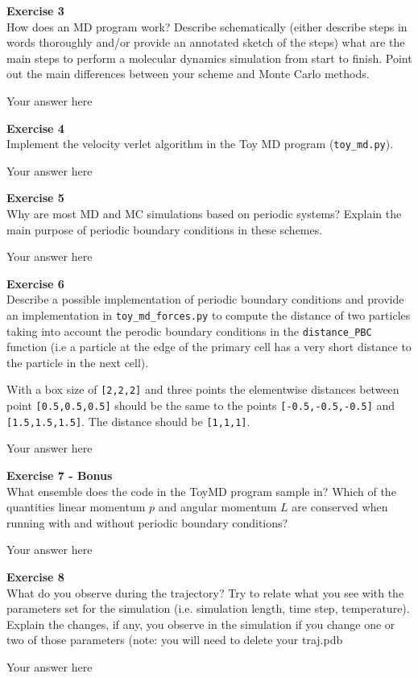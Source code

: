 \documentclass{article}
\begin{document}
\begin{mdframed}
\textbf{Exercise 3}\\
How does an MD program work? Describe schematically (either describe steps in words thoroughly and/or provide an annotated sketch of the steps) what are the main steps to perform a molecular dynamics simulation from start to finish. Point out the main
differences between your scheme and Monte Carlo methods.
\end{mdframed}

Your answer here

\begin{mdframed}
\textbf{Exercise 4}\\
Implement the velocity verlet algorithm in the Toy MD program (\texttt{toy\_md.py}).
\end{mdframed}

Your answer here

\begin{mdframed}
\textbf{Exercise 5}\\
Why are most MD and MC simulations based on periodic systems? Explain the main purpose of periodic boundary conditions in these schemes.
\end{mdframed}

Your answer here

\begin{mdframed}
\textbf{Exercise 6}\\
Describe a possible implementation of periodic boundary conditions and provide an implementation in \texttt{toy\_md\_forces.py} to compute the distance of two particles taking into account the perodic boundary conditions in the \texttt{distance\_PBC} function (i.e a particle at the edge of the primary cell has a very short distance to the particle in the next cell).

With a box size of \texttt{[2,2,2]} and three points the elementwise distances between point \texttt{[0.5,0.5,0.5]} should be the same to the points \texttt{[-0.5,-0.5,-0.5]} and \texttt{[1.5,1.5,1.5]}. The distance should be \texttt{[1,1,1]}.
\end{mdframed}

Your answer here

\begin{mdframed}
\textbf{Exercise 7 - Bonus}\\
What ensemble does the code in the ToyMD program sample in? Which of the quantities linear momentum $p$ and angular momentum $L$ are conserved when running with and without periodic boundary conditions?
\end{mdframed}

Your answer here

\begin{mdframed}
\textbf{Exercise 8}\\
What do you observe during the trajectory? Try to relate what you see with the parameters set for the simulation (i.e. simulation length, time step, temperature). Explain the changes, if any, you observe in the simulation if you change one or two of those parameters (note: you will need to delete your traj.pdb
\end{mdframed}

Your answer here
\end{document}
